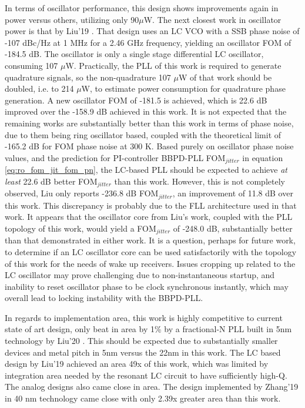 In terms of oscillator performance, this design shows improvements again in power versus others, utilizing only 90$\mu$W. The next closest work in oscillator power is that by Liu'19 \cite{Liu2019}. That design uses an LC VCO with a SSB phase noise of -107 dBc/Hz at 1 MHz for a 2.46 GHz frequency, yielding an oscillator FOM of -184.5 dB. The oscillator is only a single stage differential LC oscillator, consuming 107 $\mu$W. Practically, the PLL of this work is required to generate quadrature signals, so the non-quadrature 107 $\mu$W of that work should be doubled, i.e. to 214 $\mu$W, to estimate power consumption for quadrature phase generation. A new oscillator FOM of -181.5 is achieved, which is 22.6 dB improved over the -158.9 dB achieved in this work. It is not expected that the remaining works are substantially better than this work in terms of phase noise, due to them being ring oscillator based, coupled with the theoretical limit of -165.2 dB for FOM phase noise at 300 K. Based purely on oscillator phase noise values, and the prediction for PI-controller BBPD-PLL FOM$_{jitter}$ in equation \ref{eq:ro_fom_jit_fom_pn}, the LC-based PLL should be expected to achieve \textit{at least} 22.6 dB better FOM$_{jitter}$ than this work. However, this is not completely observed, Liu only reports -236.8 dB FOM$_{jitter}$, an improvement of 11.8 dB over this work. This discrepancy is probably due to the FLL architecture used in that work. It appears that the oscillator core from Liu's work, coupled with the PLL topology of this work, would yield a FOM$_{jitter}$ of -248.0 dB, substantially better than that demonstrated in either work. It is a question, perhaps for future work, to determine if an LC oscillator core can be used satisfactorily with the topology of this work for the needs of wake up receivers. Issues cropping up related to the LC oscillator may prove challenging due to non-instantaneous startup, and inability to reset oscillator phase to be clock synchronous instantly, which may overall lead to locking instability with the BBPD-PLL. 

In regards to implementation area, this work is highly competitive to current state of art design, only beat in area by 1\% by a fractional-N PLL built in 5nm technology by Liu'20 \cite{Liu2020}. This should be expected due to substantially smaller devices and metal pitch in 5nm versus the 22nm in this work. The LC based design by Liu'19 achieved an area 49x of this work, which was limited by integration area needed by the resonant LC circuit to have sufficiently high-Q. The analog designs also came close in area. The design implemented by Zhang'19 \cite{Zhang2019} in 40 nm technology came close with only 2.39x greater area than this work.

